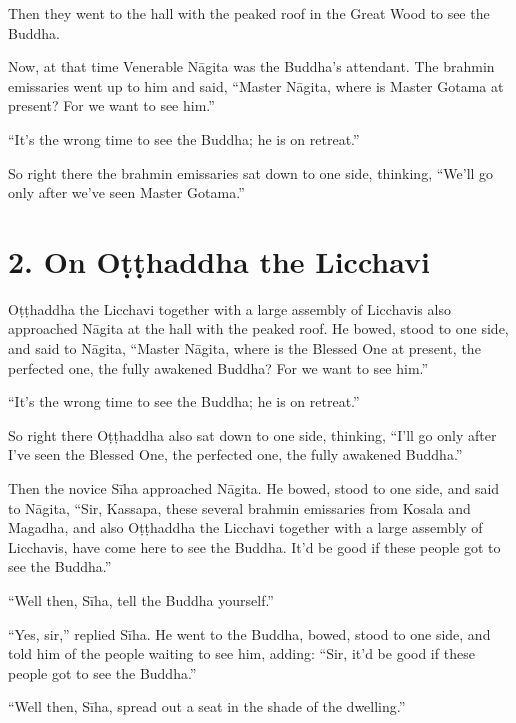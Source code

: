 \documentclass[12pt,openany]{book}%
\begin{document}
Then they went to the hall with the peaked roof in the Great Wood to see the Buddha. 

Now, at that time Venerable \textsanskrit{Nāgita} was the Buddha’s attendant. The brahmin emissaries went up to him and said, “Master \textsanskrit{Nāgita}, where is Master Gotama at present? For we want to see him.” 

“It’s the wrong time to see the Buddha; he is on retreat.” 

So right there the brahmin emissaries sat down to one side, thinking, “We’ll go only after we’ve seen Master Gotama.” 

\section*{2. On \textsanskrit{Oṭṭhaddha} the Licchavi }

\textsanskrit{Oṭṭhaddha} the Licchavi together with a large assembly of Licchavis also approached \textsanskrit{Nāgita} at the hall with the peaked roof. He bowed, stood to one side, and said to \textsanskrit{Nāgita}, “Master \textsanskrit{Nāgita}, where is the Blessed One at present, the perfected one, the fully awakened Buddha? For we want to see him.” 

“It’s the wrong time to see the Buddha; he is on retreat.” 

So right there \textsanskrit{Oṭṭhaddha} also sat down to one side, thinking, “I’ll go only after I’ve seen the Blessed One, the perfected one, the fully awakened Buddha.” 

Then the novice \textsanskrit{Sīha} approached \textsanskrit{Nāgita}. He bowed, stood to one side, and said to \textsanskrit{Nāgita}, “Sir, Kassapa, these several brahmin emissaries from Kosala and Magadha, and also \textsanskrit{Oṭṭhaddha} the Licchavi together with a large assembly of Licchavis, have come here to see the Buddha. It’d be good if these people got to see the Buddha.” 

“Well then, \textsanskrit{Sīha}, tell the Buddha yourself.” 

“Yes, sir,” replied \textsanskrit{Sīha}. He went to the Buddha, bowed, stood to one side, and told him of the people waiting to see him, adding: “Sir, it’d be good if these people got to see the Buddha.” 

“Well then, \textsanskrit{Sīha}, spread out a seat in the shade of the dwelling.” 
\end{document}
